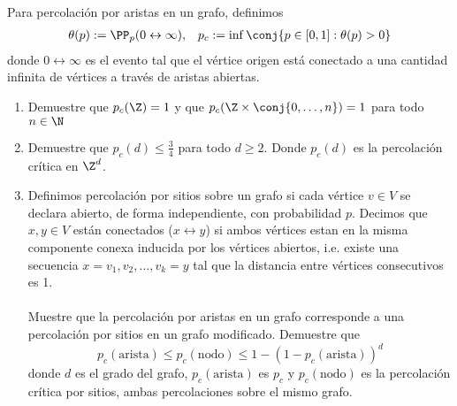 \begin{problema}{1}
Para percolación por aristas en un grafo, definimos
\begin{align*}
	\theta(p) := \PP_p(0 \leftrightarrow \infty), &&
	p_c := \inf\conj{p\in[0,1]:\theta(p) > 0}
\end{align*}
donde $0\leftrightarrow\infty$ es el evento tal que el vértice origen está conectado a una cantidad infinita de vértices a través de aristas abiertas.
	
\begin{enumerate}[label=\alph*)]
	\item Demuestre que $p_c(\Z) = 1$ y que $p_c(\Z\times\conj{0,\dots,n}) = 1$ para todo $n\in\N$ 
	\item Demuestre que $p_c(d)\leq\frac{3}{4}$ para todo $d\geq2$. Donde $p_c(d)$ es la percolación crítica en $\Z^d$.
	\item Definimos percolación por sitios sobre un grafo si cada vértice $v\in V$ se declara abierto, de forma independiente, con probabilidad $p$. Decimos que $x,y\in V$ están conectados ($x\leftrightarrow y$) si ambos vértices estan en la misma componente conexa inducida por los vértices abiertos, i.e. existe una secuencia $x=v_1,v_2,\dots,v_k=y$ tal que la distancia entre vértices consecutivos es 1. \\
	\\
	Muestre que la percolación por aristas en un grafo corresponde a una percolación por sitios en un grafo modificado. Demuestre que
		\[
			p_c(\text{arista}) \leq p_c(\text{nodo}) \leq 1 - (1 - p_c(\text{arista}))^d
		\]
		donde $d$ es el grado del grafo, $p_c(\text{arista})$ es $p_c$ y $p_c(\text{nodo})$ es la percolación crítica por sitios, ambas percolaciones sobre el mismo grafo.
\end{enumerate}
\end{problema}

